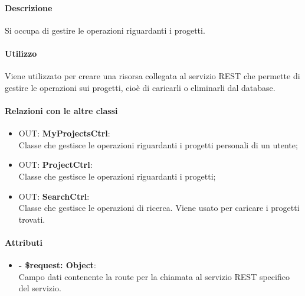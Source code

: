 		\paragraph{Descrizione}
		Si occupa di gestire le operazioni riguardanti i progetti.
		
		\paragraph{Utilizzo}
		Viene utilizzato per creare una risorsa collegata al servizio REST che permette di gestire le operazioni sui progetti, cioè di caricarli o eliminarli dal database.
		
		\paragraph{Relazioni con le altre classi}
		\begin{itemize}
			\item OUT: \textbf{MyProjectsCtrl}:\\
			Classe che gestisce le operazioni riguardanti i progetti personali di un utente;
			\item OUT: \textbf{ProjectCtrl}:\\
			Classe che gestisce le operazioni riguardanti i progetti;
			\item OUT: \textbf{SearchCtrl}:\\
			Classe che gestisce le operazioni di ricerca. Viene usato per caricare i progetti trovati.
		\end{itemize}
		
		\paragraph{Attributi}
		\begin{itemize}
			\item \textbf{- \$request: Object}:\\
			Campo dati contenente la route per la chiamata al servizio REST specifico del servizio.
		\end{itemize}	
		
